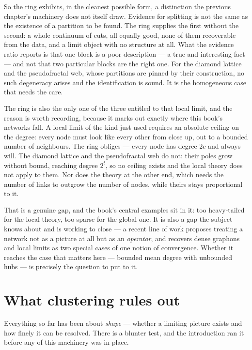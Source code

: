 So the ring exhibits, in the cleanest possible form, a distinction the previous
chapter's machinery does not itself draw. Evidence for splitting is not the same
as the existence of a partition to be found. The ring supplies the first without
the second: a whole continuum of cuts, all equally good, none of them recoverable
from the data, and a limit object with no structure at all. What the evidence
ratio reports is that one block is a poor description --- a true and interesting
fact --- and not that two particular blocks are the right one. For the diamond
lattice and the pseudofractal web, whose partitions are pinned by their
construction, no such degeneracy arises and the identification is sound. It is the
homogeneous case that needs the care.

The ring is also the only one of the three entitled to that local limit, and the
reason is worth recording, because it marks out exactly where this book's networks
fall. A local limit of the kind just used requires an absolute ceiling on the
degree: every node must look like every other from close up, out to a bounded
number of neighbours. The ring obliges --- every node has degree $2c$ and always
will. The diamond lattice and the pseudofractal web do not: their poles grow
without bound, reaching degree $2^t$, so no ceiling exists and the local theory
does not apply to them. Nor does the theory at the other end, which needs the
number of links to outgrow the number of nodes, while theirs stays proportional
to it.

That is a genuine gap, and the book's central examples sit in it: too heavy-tailed
for the local theory, too sparse for the global one. It is also a gap the subject
knows about and is working to close --- a recent line of work \citep{backhausz2018}
proposes treating a network not as a picture at all but as an \emph{operator}, and
recovers dense graphons and local limits as two special cases of one notion of
convergence. Whether it reaches the case that matters here --- bounded mean degree
with unbounded hubs --- is precisely the question to put to it.

\section{What clustering rules out}
\label{sec:gr-clustering}

Everything so far has been about \emph{shape} --- whether a limiting picture
exists and how finely it can be resolved. There is a blunter test, and the
introduction ran it before any of this machinery was in place.

